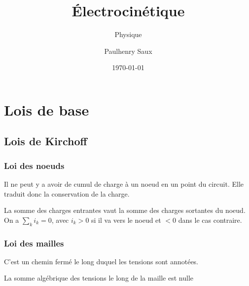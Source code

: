 \documentclass[french]{yLectureNote}
\title{Électrocinétique}
\subtitle{Physique}
\author{Paulhenry Saux}
\date{\today}
\begin{document}
\setcounter{chapter}{1}
	\chapter{Lois de base}
\section{Lois de Kirchoff}
\subsection{Loi des noeuds}
Il ne peut y a avoir de cumul de charge à un noeud en un point du circuit. Elle traduit donc la conservation de la charge.
\begin{theorem}
La somme des charges entrantes vaut la somme des charges sortantes du noeud. On a $\sum_k i_k = 0$, avec $i_k>0$ si il va vers le noeud et $<0$ dans le cas contraire.
\end{theorem}
\subsection{Loi des mailles}
\begin{definition}[Maille]
C'est un chemin fermé le long duquel les tensions sont annotées.
\end{definition}
\begin{theorem}
 La somme algébrique des tensions le long de la maille est nulle
\end{theorem}

\end{document}
